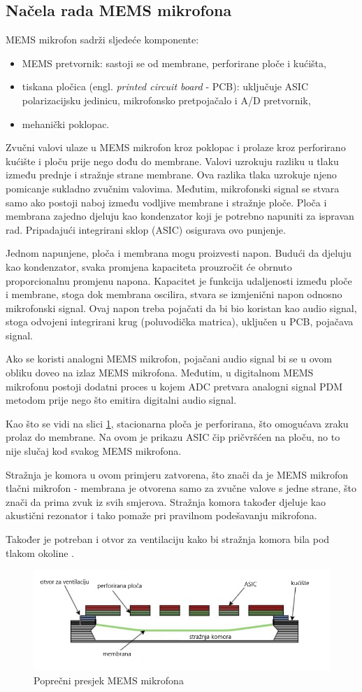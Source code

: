 \subsection{Načela rada MEMS mikrofona}

MEMS mikrofon sadrži sljedeće komponente:
\begin{itemize}
	\item MEMS pretvornik: sastoji se od membrane, perforirane ploče i kućišta,
	\item tiskana pločica (engl. \textit{printed circuit board} - PCB): uključuje ASIC polarizacijsku jedinicu, mikrofonsko pretpojačalo i A/D pretvornik,
	\item mehanički poklopac.
\end{itemize}

Zvučni valovi ulaze u MEMS mikrofon kroz poklopac i prolaze kroz perforirano kućište i ploču prije nego dođu do membrane. Valovi uzrokuju razliku u tlaku između prednje i stražnje strane membrane. Ova razlika tlaka uzrokuje njeno pomicanje sukladno zvučnim valovima. Međutim, mikrofonski signal se stvara samo ako postoji naboj između vodljive membrane i stražnje ploče. 
Ploča i membrana zajedno djeluju kao kondenzator koji je potrebno napuniti za ispravan
rad. Pripadajući integrirani sklop (ASIC) osigurava ovo punjenje.

Jednom napunjene, ploča i membrana mogu proizvesti napon. Budući da djeluju kao kondenzator, svaka promjena kapaciteta prouzročit će obrnuto proporcionalnu promjenu napona. Kapacitet je funkcija udaljenosti između ploče i membrane, stoga dok membrana oscilira, stvara se izmjenični napon odnosno mikrofonski signal. Ovaj napon treba pojačati da bi bio koristan kao audio signal, stoga odvojeni integrirani krug (poluvodička matrica), uključen u PCB, pojačava signal.

Ako se koristi analogni MEMS mikrofon, pojačani audio signal bi se u ovom obliku doveo na izlaz MEMS mikrofona.  Međutim, u digitalnom MEMS mikrofonu postoji dodatni proces u kojem ADC pretvara analogni signal PDM metodom prije nego što emitira digitalni audio signal.

Kao što se vidi na slici \ref{fig:mems-mic}, stacionarna ploča je perforirana, što omogućava zraku prolaz do membrane. Na ovom je prikazu ASIC čip pričvršćen na ploču, no to nije slučaj kod svakog MEMS mikrofona. 

Stražnja je komora u ovom primjeru zatvorena, što znači da je MEMS mikrofon tlačni mikrofon - membrana je otvorena samo za zvučne valove s jedne strane, što znači da prima zvuk iz svih smjerova. Stražnja komora također djeluje kao akustični rezonator i tako pomaže pri pravilnom podešavanju mikrofona.

Također je potreban i otvor za ventilaciju kako bi stražnja komora bila pod tlakom okoline \cite{memsdepth}.

\begin{figure}[ht]
	\includegraphics[width=\linewidth]{imgs/mems_mic}
	\caption{Poprečni presjek MEMS mikrofona \cite{memsdepth}}
	\label{fig:mems-mic}
\end{figure}